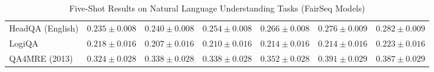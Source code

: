 \documentclass[11pt]{article}
\begin{document}
{\begin{landscape}
\begin{table}
\begin{tabular}{l c c c c c c }
HeadQA (English) & $0.235 \pm 0.008$ & $0.240 \pm 0.008$ & $0.254 \pm 0.008$ & $0.266 \pm 0.008$ & $0.276 \pm 0.009$ & $0.282 \pm 0.009$ \\ 
LogiQA & $0.218 \pm 0.016$ & $0.207 \pm 0.016$ & $0.210 \pm 0.016$ & $0.214 \pm 0.016$ & $0.214 \pm 0.016$ & $0.223 \pm 0.016$ \\ 
QA4MRE (2013) & $0.324 \pm 0.028$ & $0.338 \pm 0.028$ & $0.338 \pm 0.028$ & $0.352 \pm 0.028$ & $0.391 \pm 0.029$ & $0.387 \pm 0.029$ \\ 
\bottomrule 
\end{tabular}
\caption{Five-Shot Results on Natural Language Understanding Tasks (FairSeq Models)}
\label{tab:nlu_fairseq_5}
\end{table}



\end{landscape}}
\end{document}
